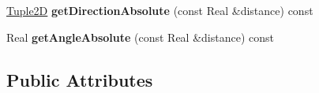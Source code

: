\begin{DoxyCompactItemize}
\item 
\hypertarget{structSquirrelMotionPlanner_1_1ParametricFunctionCubic2D_ace779976d430ded32e640406671d2ccd}{\hyperlink{structSquirrelMotionPlanner_1_1Tuple2D}{Tuple2\-D} {\bfseries get\-Direction\-Absolute} (const Real \&distance) const }\label{structSquirrelMotionPlanner_1_1ParametricFunctionCubic2D_ace779976d430ded32e640406671d2ccd}

\item 
\hypertarget{structSquirrelMotionPlanner_1_1ParametricFunctionCubic2D_ad2cecafea51502abf83a1749350b6887}{Real {\bfseries get\-Angle\-Absolute} (const Real \&distance) const }\label{structSquirrelMotionPlanner_1_1ParametricFunctionCubic2D_ad2cecafea51502abf83a1749350b6887}

\end{DoxyCompactItemize}
\subsection*{Public Attributes}
